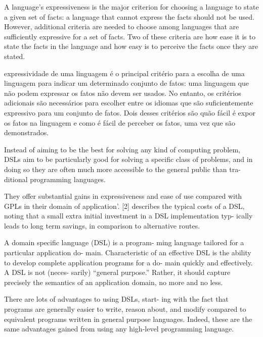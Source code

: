 \label{analiseSubjetiva}
\vspace{-6mm}

A language's expressiveness is the major criterion for choosing a language to
state a given set of facts: a language that cannot express the facts should not
be used. However, additional criteria are needed to choose among languages that
are sufficiently expressive  for a set of facts. Two of these criteria are how
ease it is to state the facts in the language and how easy is to perceive the
facts once they are stated.

expressividade de uma linguagem é o principal critério para a escolha de uma
linguagem para indicar um determinado conjunto de fatos: uma linguagem que não
podem expressar os fatos não devem ser usados. No entanto, os critérios
adicionais são necessários para escolher entre os idiomas que são
suficientemente expressivo para um conjunto de fatos. Dois desses critérios são
quão fácil é expor os fatos na linguagem e como é fácil de perceber os fatos,
uma vez que são demonstrados.

\cite{mackinlay1985expressiveness}



Instead of aiming to be the best for solving any kind of
computing problem, DSLs aim to be particularly good for
solving a specific class of problems, and in doing so they
are often much more accessible to the general public than tra-
ditional programming languages.
\cite{taha2008domain}

They offer substantial gains in expressiveness and ease of use compared
with GPLs in their domain of application’. [2] describes the typical costs of a
DSL, noting that a small extra initial investment in a DSL implementation typ-
ically leads to long term savings, in comparison to alternative routes.
\cite{tratt2008evolving}

A domain specific language (DSL) is a program-
ming language tailored for a particular application do-
main. Characteristic of an effective DSL is the ability
to develop complete application programs for a do-
main quickly and effectively. A DSL is not (neces-
sarily) “general purpose.” Rather, it should capture
precisely the semantics of an application domain, no
more and no less.

There are lots of advantages to using DSLs, start-
ing with the fact that programs are generally easier to
write, reason about, and modify compared to equivalent 
programs written in general purpose languages.
Indeed, these are the same advantages gained from using any high-level
programming language.
\cite{hudak1998modular}




